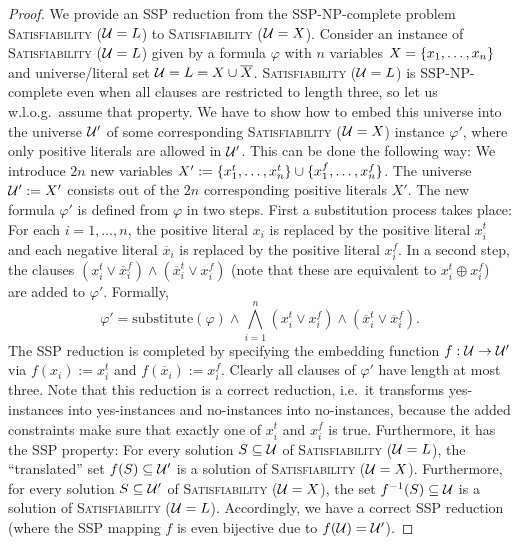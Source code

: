 \begin{proof}
    We provide an SSP reduction from the SSP-NP-complete problem \textsc{Satisfiability ($\mathcal{U} = L$)} to \textsc{Satisfiability ($\mathcal{U} = X$)}. 
    Consider an instance of \textsc{Satisfiability ($\mathcal{U} = L$)} given by a formula $\varphi$ with $n$ variables $X = \{ x_1, \ldots, x_n \}$ and universe/literal set $\mathcal{U} = L = X \cup \overline{X}$.
    \textsc{Satisfiability ($\mathcal{U} = L$)} is SSP-NP-complete even when all clauses are restricted to length three, so let us w.l.o.g.\ assume that property.
    We have to show how to embed this universe into the universe $\mathcal{U}'$ of some corresponding \textsc{Satisfiability ($\mathcal{U} = X$)} instance $\varphi'$, where only positive literals are allowed in $\mathcal{U}'$.
    This can be done the following way:
    We introduce $2n$ new variables $X' := \{ x^t_1, \ldots, x^t_n \} \cup \{ x^f_1, \ldots, x^f_n \}$.
    The universe $\mathcal{U}' := X'$ consists out of the $2n$ corresponding positive literals $X'$.
    The new formula $\varphi'$ is defined from $\varphi$ in two steps.
    First a substitution process takes place: 
    For each $i=1,\dots,n$, the positive literal $x_i$ is replaced by the positive literal $x^t_i$ and each negative literal $\overline x_i$ is replaced by the positive literal $x_i^f$.
    In a second step, the clauses $(x^t_i \lor \overline x^f_i) \land (\overline x^t_i \lor x^f_i)$ (note that these are equivalent to $x_i^t \oplus x_i^f$) are added to $\varphi'$.
    Formally,
    \[
        \varphi' = \text{substitute}(\varphi) \land \bigwedge_{i=1}^n (x_i^t \lor x_i^f)\land (\overline{x}_i^t \lor \overline{x}^f_i).
    \]
    The SSP reduction is completed by specifying the embedding function $f : \mathcal{U} \to \mathcal{U}'$ via $f(x_i) := x_i^t$ and $f(\overline x_i) := x_i^f$.
    Clearly all clauses of $\varphi'$ have length at most three.
    Note that this reduction is a correct reduction, i.e.\ it transforms yes-instances into yes-instances and no-instances into no-instances, because the added constraints make sure that exactly one of $x_i^t$ and $x_i^f$ is true.
    Furthermore, it has the SSP property:
    For every solution $S \subseteq \mathcal{U}$ of \textsc{Satisfiability ($\mathcal{U} = L$)}, the \enquote{translated} set $f(S) \subseteq \mathcal{U}'$ is a solution of \textsc{Satisfiability ($\mathcal{U} = X$)}.
    Furthermore, for every solution $S \subseteq \mathcal{U}'$ of \textsc{Satisfiability ($\mathcal{U} = X$)}, the set $f^{-1}(S)\subseteq \mathcal{U}$ is a solution of \textsc{Satisfiability ($\mathcal{U} = L$)}.
    Accordingly, we have a correct SSP reduction (where the SSP mapping $f$ is even bijective due to $f(\mathcal{U}) = \mathcal{U}'$). 
\end{proof}

